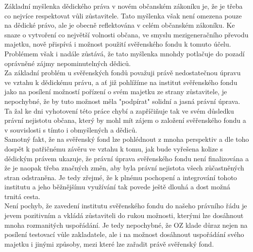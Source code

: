 \documentclass{article}
\begin{document}
Základní myšlenka dědického práva v novém občanském zákoníku je, že je třeba co nejvíce respektovat vůli zůstavitele. Tato myšlenka však není omezena pouze na dědické právo, ale je obecně reflektována v celém občanském zákoníku. Ke snaze o vytvoření co největší volnosti občana, ve smyslu mezigeneračního převodu majetku, nově přispívá i možnost použití svěřenského fondu k tomuto účelu. Problémem však i nadále zůstává, že tato myšlenka mnohdy potlačuje do pozadí oprávněné zájmy nepominutelných dědiců.\\

Za základní problém u svěřenských fondů považuji právě nedostatečnou úpravu ve vztahu k dědickému právu, a ať již pohlížíme na institut svěřenského fondu jako na posílení možností pořízení o svém majetku ze strany zůstavitele, je nepochybné, že by tuto možnost měla "podpírat" solidní a jasná právní úprava. Ta žal ke dni vyhotovení této práce chybí a zapříčiňuje tak ve svém důsledku právní nejistotu občana, který by mohl mít zájem o založení svěřenského fondu a v souvislosti s tímto i obmyšlených a dědiců.\\

Samotný fakt, že na svěřenský fond lze pohlédnout z mnoha perspektiv a dle toho dospět k patřičnému závěru ve vztahu k tomu, jak bude vyřešena kolize s dědickým právem ukazuje, že právní úprava svěřenského fondu není finalizována a že je naopak třeba značných změn, aby byla právní nejistota všech zůčastněných stran odstraněna. Je tedy zřejmé, že k plnému pochopení a integrování tohoto institutu a jeho běžnějšímu využívání tak povede ještě dlouhá a dost možná trnitá cesta.\\

Není pochyb, že zavedení institutu svěřenského fondu do našeho právního řádu je jevem pozitivním a vkládá zůstaviteli do rukou možnosti, kterými lze dosáhnout mnoha rozmanitých uspořádání. Je tedy nepochybné, že OZ klade důraz nejen na posílení testovací vůle zakladatele, ale i na možnost dosáhnout uspořádání svého majetku i jinými způsoby, mezi které lze zařadit právě svěřenský fond.\\
\end{document}

